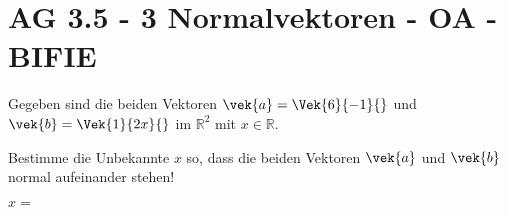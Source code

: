 \section{AG 3.5 - 3 Normalvektoren - OA - BIFIE}

\begin{beispiel}[AG 3.5]{1} %
Gegeben sind die beiden Vektoren $\vek{a}=\Vek{6}{-1}{}$ und $\vek{b}=\Vek{1}{2x}{}$ im $\mathbb{R}^2$ mit $x \in \mathbb{R}$.

\leer

Bestimme die Unbekannte $x$ so, dass die beiden Vektoren $\vek{a}$ und $\vek{b}$ normal aufeinander stehen!

\leer

$x=$ 

\end{beispiel}